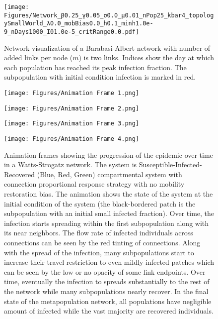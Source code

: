 \begin{figure}[!ht]
    \centering
    \texttt{[image: Figures/Network\_β0.25\_γ0.05\_σ0.0\_μ0.01\_nPop25\_kbar4\_topologySmallWorld\_λ0.0\_mobBias0.0\_h0.1\_minh1.0e-9\_nDays1000\_I01.0e-5\_critRange0.0.pdf]}
    \caption{\small Network visualization of a Barabasi-Albert network with number of added links per node ($m$) is two links. Indices show the day at which each population has reached its peak infection fraction. The subpopulation with initial condition infection is marked in red.}
    \label{}
\end{figure}

\begin{figure}[!ht]
	\centering
	\begin{minipage}[b]{0.45\textwidth}
		\texttt{[image: Figures/Animation Frame 1.png]}
	\end{minipage}
	\hfill
	\begin{minipage}[b]{0.45\textwidth}
		\texttt{[image: Figures/Animation Frame 2.png]}
	\end{minipage}
	\vfill
	\begin{minipage}[b]{0.45\textwidth}
		\texttt{[image: Figures/Animation Frame 3.png]}
	\end{minipage}
	\hfill
	\begin{minipage}[b]{0.45\textwidth}
		\texttt{[image: Figures/Animation Frame 4.png]}
	\end{minipage}
	\caption{Animation frames showing the progression of the epidemic over time in a Watts-Strogatz network. The system is Susceptible-Infected-Recovered (Blue, Red, Green) compartmental system with connection proportional response strategy with no mobility restoration bias. The animation shows the state of the system at the initial condition of the system (the black-bordered patch is the subpopulation with an initial small infected fraction). Over time, the infection starts spreading within the first subpopulation along with its near neighbors. The flow rate of infected individuals across connections can be seen by the red tinting of connections. Along with the spread of the infection, many subpopulations start to increase their travel restriction to even mildly-infected patches which can be seen by the low or no opacity of some link endpoints. Over time, eventually the infection to spreads substantially to the rest of the network while many subpopulations nearly recover. In the final state of the metapopulation network, all populations have negligible amount of infected while the vast majority are recovered individuals.}
\end{figure}

